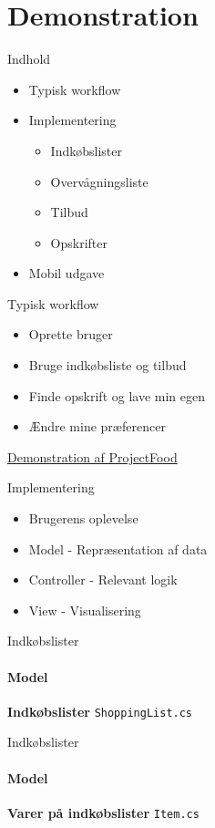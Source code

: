 \section{Demonstration}

\begin{frame}{Indhold}
    \begin{itemize}
        \item Typisk workflow
        \item Implementering
        \begin{itemize}
	    	\item Indkøbslister
	    	\item Overvågningsliste
	    	\item Tilbud
	    	\item Opskrifter
        \end{itemize}
        \item Mobil udgave    
    \end{itemize}
\end{frame}

\begin{frame}{Typisk workflow}
	\begin{itemize}
	\item Oprette bruger
	\item Bruge indkøbsliste og tilbud
	\item Finde opskrift og lave min egen
	\item Ændre mine præferencer
	\end{itemize}
	\href{http://james:8080}{Demonstration af ProjectFood}
\end{frame}

\begin{frame}{Implementering}
	\begin{itemize}
	\item Brugerens oplevelse
	\vspace{20pt}
	\item Model - Repræsentation af data
	\item Controller - Relevant logik
	\item View - Visualisering
	\end{itemize}	
\end{frame}

\begin{frame}{Indkøbslister}
	\framesubtitle{Model}
	\textbf{Indkøbslister} \texttt{ShoppingList.cs}
		
\end{frame}
\begin{frame}{Indkøbslister}
	\framesubtitle{Model}	
	\textbf{Varer på indkøbslister} \texttt{Item.cs}
		
\end{frame}

